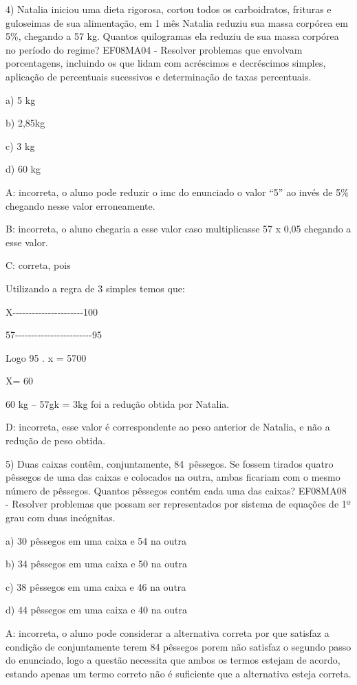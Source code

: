 4) Natalia iniciou uma dieta rigorosa, cortou todos os carboidratos,
frituras e guloseimas de sua alimentação, em 1 mês Natalia reduziu sua
massa corpórea em 5\%, chegando a 57 kg. Quantos quilogramas ela reduziu
de sua massa corpórea no período do regime? EF08MA04 - Resolver
problemas que envolvam porcentagens, incluindo os que lidam com
acréscimos e decréscimos simples, aplicação de percentuais sucessivos e
determinação de taxas percentuais.

a) 5 kg

b) 2,85kg

c) 3 kg

d) 60 kg

A: incorreta, o aluno pode reduzir o imc do enunciado o valor ``5'' ao
invés de 5\% chegando nesse valor erroneamente.

B: incorreta, o aluno chegaria a esse valor caso multiplicasse 57 x 0,05
chegando a esse valor.

C: correta, pois

Utilizando a regra de 3 simples temos que:

X-\/-\/-\/-\/-\/-\/-\/-\/-\/-\/-\/-\/-\/-\/-\/-\/-\/-\/-\/-\/-\/-100

57-\/-\/-\/-\/-\/-\/-\/-\/-\/-\/-\/-\/-\/-\/-\/-\/-\/-\/-\/-\/-\/-\/-\/-95

Logo 95 . x = 5700

X= 60

60 kg -- 57gk = 3kg foi a redução obtida por Natalia.

D: incorreta, esse valor é correspondente ao peso anterior de Natalia, e
não a redução de peso obtida.

5) Duas caixas contêm, conjuntamente, 84~pêssegos. Se fossem tirados
quatro pêssegos de uma das caixas e colocados na outra, ambas ficariam
com o mesmo número de pêssegos. Quantos pêssegos contém cada uma das
caixas? EF08MA08 - Resolver problemas que possam ser representados por
sistema de equações de 1º grau com duas incógnitas.

a) 30 pêssegos em uma caixa e 54 na outra

b) 34 pêssegos em uma caixa e 50 na outra

c) 38 pêssegos em uma caixa e 46 na outra

d) 44 pêssegos em uma caixa e 40 na outra

A: incorreta, o aluno pode considerar a alternativa correta por que
satisfaz a condição de conjuntamente terem 84 pêssegos porem não
satisfaz o segundo passo do enunciado, logo a questão necessita que
ambos os termos estejam de acordo, estando apenas um termo correto não é
suficiente que a alternativa esteja correta.

